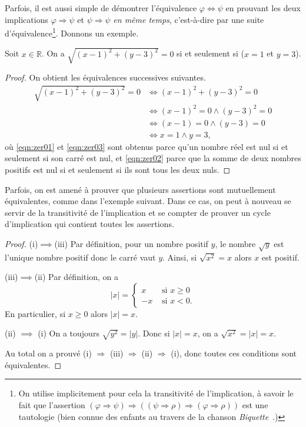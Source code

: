 \documentclass[french,course,oneside,theoremnosection]{lecture}
\newcommand{\R}{\mathbb{R}}
\newcommand{\iimplies}{\Rightarrow}
\begin{document}
Parfois, il est aussi simple de démontrer l'équivalence $\varphi \iff \psi$ en prouvant les deux implications $\varphi \iimplies \psi$ et $\psi \iimplies \psi$ \emph{en même temps}, c'est-à-dire par une suite d'équivalence\footnote{On utilise implicitement pour cela la transitivité de l'implication, à savoir le fait que l'assertion $(\varphi \iimplies \psi) \iimplies  ((\psi \iimplies \rho)\iimplies (\varphi \iimplies \rho))$ est une tautologie (bien connue des enfants au travers de la chanson \emph{Biquette}~.)}. Donnons un exemple.
\begin{example}
Soit $x\in \R$. On a $\sqrt{(x-1)^2+(y-3)^2}=0$ si et seulement si ($x=1$ et $y=3$).
\end{example}
\begin{proof}
On obtient les équivalences successives suivantes.
\begin{align}
\sqrt{(x-1)^2+(y-3)^2}=0 & \iff (x-1)^2+(y-3)^2=0\label{eqn:zer01}\\
& \iff (x-1)^2=0 \wedge (y-3)^2=0\label{eqn:zer02}\\
& \iff (x-1)=0 \wedge (y-3)=0\label{eqn:zer03}\\
& \iff x=1 \wedge y=3,\label{eqn:zer04}
\end{align}
où \eqref{eqn:zer01} et \eqref{eqn:zer03} sont obtenus parce qu'un nombre réel est nul si et seulement si son carré est nul, et \eqref{eqn:zer02} parce que la somme de deux nombres positifs est nul si et seulement si ils sont tous les deux nuls.
\end{proof}

Parfois, on est amené à prouver que plusieurs assertions sont mutuellement équivalentes, comme dans l'exemple suivant. Dans ce cas, on peut à nouveau se servir de la transitivité de l'implication et se compter de prouver un cycle d'implication qui contient toutes les assertions.
\begin{proof}
(i)$\implies$(iii) Par définition, pour un nombre positif $y$, le nombre $\sqrt{y}$ est l'unique nombre positif donc le carré vaut $y$. Ainsi, si $\sqrt{x^2}=x$ alors $x$ est positif.

(iii)$\implies$(ii) Par définition, on a
\[
|x| = \left\{\begin{array}{ll}
x & \text{ si } x\geq 0\\
-x & \text{ si } x< 0.
\end{array}\right.
\]
En particulier, si $x\geq 0$ alors $|x|=x$.

(ii) $\implies$ (i) On a toujours $\sqrt{y^2}=|y|$. Donc si $|x|=x$, on a $\sqrt{x^2}=|x|=x$.

Au total on a prouvé (i) $\iimplies$ (iii) $\iimplies$ (ii) $\iimplies$ (i), donc toutes ces conditions sont équivalentes.
\end{proof}
\end{document}

